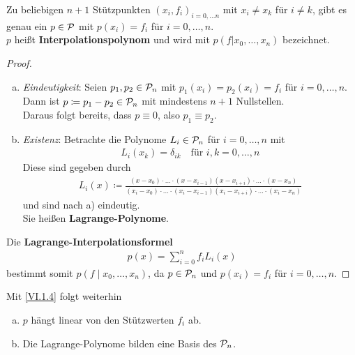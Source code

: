 
\begin{Satze}\label{6.1.1}
  Zu beliebigen $n+1$ Stützpunkten $(x_i, f_i)_{i=0, \dots n}$ 
  mit $x_i\neq x_k$ für $i\neq k$,
  gibt es genau ein $p\in \mathcal{P}$ mit $p(x_i) = f_i$ für $i=0,
  \dots ,n$.\\
  $p$ heißt \textbf{Interpolationspolynom}
  und wird mit $p(f|x_0, \dots, x_n) $ bezeichnet.
\end{Satze}

\begin{proof}~
  \begin{enumerate}[a)]
  \item \textit{Eindeutigkeit}:
    Seien $p_1, p_2\in \mathcal{P}_n$ mit $p_1(x_i)=p_2(x_i) = f_i$
    für $i=0, \dots, n$.
    Dann ist $p\coloneqq p_1-p_2 \in\mathcal{P}_n$
    mit mindestens $n+1$ Nullstellen. \\
    Daraus folgt bereits, dass $p\equiv 0$, also $p_1\equiv p_2$.

  \item \textit{Existenz}: 
    Betrachte die Polynome $L_i\in\mathcal{P}_n$ für $i=0, \dots, n$
    mit 
    \begin{gather}
      L_i(x_k) = \delta_{ik}\quad \text{für } i,k=0, \dots, n 
      \label{VI.1.2}
    \end{gather}
    Diese sind gegeben durch
    \begin{gather}
      L_i(x) \coloneqq \frac{(x-x_0)\cdot \dotsc
        \cdot (x-x_{i-1})(x-x_{i+i}) \cdot \dotsc
        \cdot (x-x_n)}
      {(x_i-x_0)\cdot \dots
        \cdot (x_i-x_{i-1})(x_i-x_{i+i}) \cdot \dotsc
        \cdot (x_i-x_n)}
      \label{VI.1.3}
    \end{gather}
    und sind nach a) eindeutig. \\
    Sie heißen \textbf{Lagrange-Polynome}.
  \end{enumerate}
  Die \textbf{Lagrange-Interpolationsformel}
  \begin{gather}
    p(x) = \sum_{i=0}^{n} f_iL_i(x)
    \label{VI.1.4}
  \end{gather}
  bestimmt somit $p(f\mid x_0, \dots, x_n)$,
  da $p\in\mathcal{P}_n$ und $p(x_i) = f_i$ für $i=0,\dots, n$.
\end{proof}

Mit \eqref{VI.1.4} folgt weiterhin
\begin{enumerate}[a)]
\item $p$ hängt linear von den Stützwerten $f_i$ ab.
\item Die Lagrange-Polynome bilden eine Basis des $\mathcal{P}_n$.
\end{enumerate}

